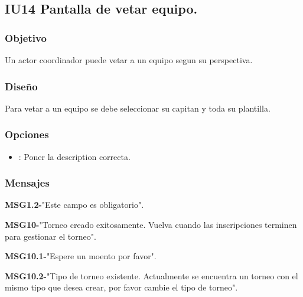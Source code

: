 \subsection{IU14 Pantalla de vetar equipo.}

\subsubsection{Objetivo}
	Un actor coordinador puede vetar a un equipo segun su perspectiva.

\subsubsection{Diseño}
  Para vetar a un equipo se debe seleccionar su capitan y toda su plantilla.


\subsubsection{Opciones}
\begin{itemize}
	\item {}: Poner la description correcta.
\end{itemize}

\subsubsection{Mensajes}
	\begin{Citemize}
		\item {\bf MSG1.2-}"Este campo es obligatorio".
		\item {\bf MSG10-}"Torneo creado exitosamente. Vuelva cuando las inscripciones terminen para gestionar el torneo".
		\item {\bf MSG10.1-}"Espere un moento por favor".
		\item {\bf MSG10.2-}"Tipo de torneo existente. Actualmente se encuentra un torneo con el mismo tipo que desea crear, por favor cambie el tipo de torneo".
\end{Citemize}